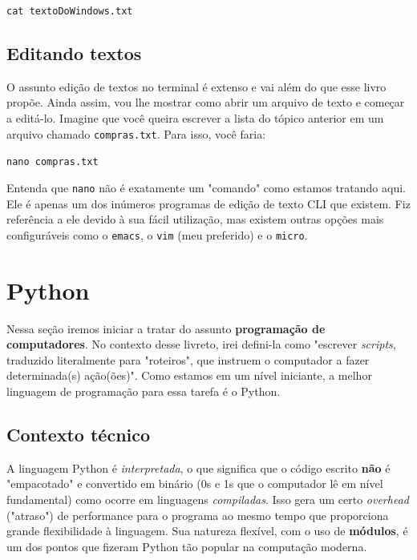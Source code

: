 \documentclass{article}
\begin{document}
	\vspace{1ex}
	\texttt{cat textoDoWindows.txt} 
	\vspace{1ex} 

	\subsection{Editando textos} 

	O assunto edição de textos no terminal é extenso e vai além do que esse livro propõe. Ainda assim, vou lhe mostrar como abrir 
	um arquivo de texto e começar a editá-lo. Imagine que você queira escrever a lista do tópico anterior em um arquivo chamado 
	\texttt{compras.txt}. Para isso, você faria: 
	
	\vspace{1ex} 
	\texttt{nano compras.txt} 
	\vspace{1ex}

	Entenda que \texttt{nano} não é exatamente um "comando" como estamos tratando aqui. Ele é apenas um dos inúmeros 
	programas de edição de texto CLI que existem. Fiz referência a ele devido à sua fácil utilização, mas existem
	outras opções mais configuráveis como o \texttt{emacs}, o \texttt{vim} (meu preferido) e o \texttt{micro}. 


	\section{Python} 

	Nessa seção iremos iniciar a tratar do assunto \textbf{programação de computadores}. No contexto desse livreto, 
	irei defini-la como "escrever \textit{scripts}, traduzido literalmente para "roteiros", que instruem o computador a fazer
	determinada(s) ação(ões)". Como estamos em um nível iniciante, a melhor linguagem de programação para essa tarefa 
	é o Python. 

	\subsection{Contexto técnico} 

	A linguagem Python é \textit{interpretada}, o que significa que o código escrito \textbf{não} é "empacotado" e
	convertido em binário (0s e 1s que o computador lê em nível fundamental) como ocorre em linguagens \textit{compiladas}. 
	Isso gera um certo \textit{overhead} ("atraso") de performance para o programa ao mesmo tempo que proporciona grande 
	flexibilidade à linguagem. Sua natureza flexível, com o uso de \textbf{módulos}, é um dos pontos que fizeram Python 
	tão popular na computação moderna. 
\end{document}
